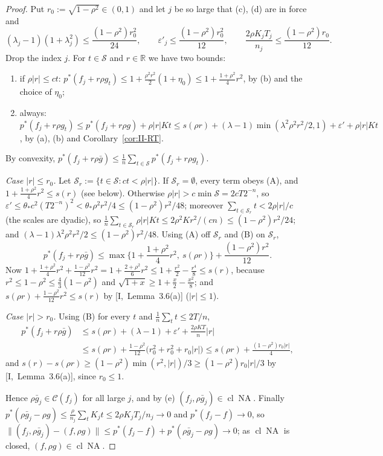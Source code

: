 \documentclass[10pt]{amsart}
\theoremstyle{definition}
\theoremstyle{remark}
\newcommand{\NA}{\operatorname{NA}}
\newcommand{\R}{\mathbb R}
\newcommand{\Cset}{\mathcal C}
\newcommand{\cl}{\operatorname{cl}}
\begin{document}
\begin{proof}
Put $r_0:=\sqrt{1-\rho^2}\in(0,1)$ and let $j$ be so large that
(c), (d) are in force and
\[
 (\lambda_j-1)(1+\lambda_j^2)\le\frac{(1-\rho^2)r_0^2}{24},\qquad
 \varepsilon'_j\le\frac{(1-\rho^2)r_0^2}{12},\qquad
 \frac{2\rho K_jT_j}{n_j}\le\frac{(1-\rho^2)r_0}{12}.
\]
Drop the index $j$.  For $t\in\mathcal S$ and $r\in\R$ we have two bounds:
\begin{enumerate}
\item[(A)] if $\rho|r|\le ct$: $p^*(f_j+r\rho g_t)\le1+\frac{\rho^2r^2}2
(1+\eta_0)\le1+\frac{1+\rho^2}4r^2$, by (b) and the choice of $\eta_0$;
\item[(B)] always: $p^*(f_j+r\rho g_t)\le p^*(f_j+r\rho g)+\rho|r|Kt\le
s(\rho r)+(\lambda-1)\min(\lambda^2\rho^2r^2/2,1)+\varepsilon'+\rho|r|Kt$,
by (a), (b) and Corollary~\ref{cor:II-RT}.
\end{enumerate}
By convexity, $p^*(f_j+r\rho\bar g)\le\frac1n\sum_{t\in\mathcal S}p^*(f_j+r
\rho g_t)$.

\emph{Case $|r|\le r_0$.}  Let $\mathcal S_r:=\{t\in\mathcal S:ct<\rho|r|\}$.
If $\mathcal S_r=\emptyset$, every term obeys (A), and $1+\frac{1+\rho^2}4r^2
\le s(r)$ (see below).  Otherwise $\rho|r|>c\min\mathcal S=2cT2^{-n}$, so
$\varepsilon'\le\theta_*c^2(T2^{-n})^2<\theta_*\rho^2r^2/4\le(1-\rho^2)r^2/48$;
moreover $\sum_{t\in\mathcal S_r}t<2\rho|r|/c$ (the scales are dyadic), so
$\frac1n\sum_{t\in\mathcal S_r}\rho|r|Kt\le2\rho^2Kr^2/(cn)\le(1-\rho^2)r^2/
24$; and $(\lambda-1)\lambda^2\rho^2r^2/2\le(1-\rho^2)r^2/48$.  Using (A) off
$\mathcal S_r$ and (B) on $\mathcal S_r$,
\[
 p^*(f_j+r\rho\bar g)\le\max\Big\{1+\frac{1+\rho^2}4r^2,\ s(\rho r)\Big\}+
 \frac{(1-\rho^2)r^2}{12}.
\]
Now $1+\frac{1+\rho^2}4r^2+\frac{1-\rho^2}{12}r^2=1+\frac{2+\rho^2}6r^2\le
1+\frac{r^2}2-\frac{r^4}8\le s(r)$, because $r^2\le1-\rho^2\le
\frac43(1-\rho^2)$ and $\sqrt{1+x}\ge1+\frac x2-\frac{x^2}8$; and
$s(\rho r)+\frac{1-\rho^2}{12}r^2\le s(r)$ by [I,~Lemma~3.6(a)] ($|r|\le1$).

\emph{Case $|r|>r_0$.}  Using (B) for every $t$ and $\frac1n\sum_t t\le2T/n$,
\[
 \begin{aligned}
 p^*(f_j+r\rho\bar g)&\le s(\rho r)+(\lambda-1)+\varepsilon'+\frac{2\rho KT}n|r|\\
 &\le s(\rho r)+\frac{1-\rho^2}{12}\big(r_0^2+r_0^2+r_0|r|\big)\le s(\rho r)+
 \frac{(1-\rho^2)r_0|r|}4 ,
 \end{aligned}
\]
and $s(r)-s(\rho r)\ge(1-\rho^2)\min(r^2,|r|)/3\ge(1-\rho^2)r_0|r|/3$ by
[I,~Lemma~3.6(a)], since $r_0\le1$.

Hence $\rho\bar g_j\in\Cset(f_j)$ for all large $j$, and by (e)
$(f_j,\rho\bar g_j)\in\cl\NA$.  Finally $p^*(\rho\bar g_j-\rho g)\le\frac\rho
{n_j}\sum_tK_jt\le2\rho K_jT_j/n_j\to0$ and $p^*(f_j-f)\to0$, so
$\|(f_j,\rho\bar g_j)-(f,\rho g)\|\le p^*(f_j-f)+p^*(\rho\bar g_j-\rho g)\to0$;
as $\cl\NA$ is closed, $(f,\rho g)\in\cl\NA$.
\end{proof}
\end{document}
